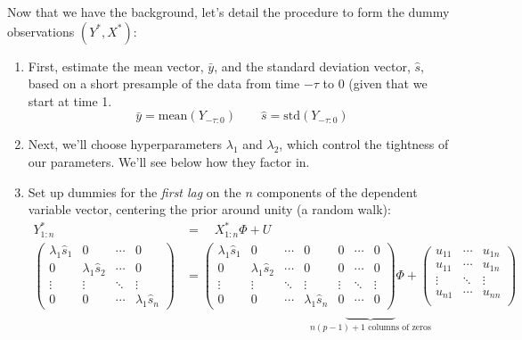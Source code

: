 \documentclass[12pt]{article}
\theoremstyle{plain}
\theoremstyle{definition}
\theoremstyle{remark}
\begin{document}
Now that we have the background, let's detail the procedure
to form the dummy observations $( Y^*, X^*)$:
\begin{enumerate}
    \item First, estimate the mean vector, $\bar{y}$, and the
	standard deviation vector, $\hat{s}$, based on
	a short presample of the data from time
	$-\tau$ to 0 (given that we start at time 1.
	\[ \bar{y} = \text{mean}\left(Y_{-\tau:0}\right)
	    \qquad \hat{s} = \text{std}\left(Y_{-\tau:0}\right)
	    \]
    \item Next, we'll choose hyperparameters $\lambda_1$ and
	$\lambda_2$, which control the tightness of our
	parameters. We'll see below how they factor in.
    \item Set up dummies for the \emph{first lag} on the $n$
	components of the dependent variable vector,
	centering the prior around unity (a random walk):
	\begin{align*}
	    Y^*_{1:n} \quad &= \quad X^*_{1:n} \Phi + U \\
	    \begin{pmatrix} \lambda_1 \hat{s}_1
		    & 0 & \cdots & 0 \\ 
		0 & \lambda_1 \hat{s}_2 & \cdots & 0 \\ 
		\vdots & \vdots & \ddots & \vdots \\
		0 & 0 & \cdots &
		\lambda_1 \hat{s}_n \end{pmatrix} &=
	    \begin{pmatrix} \lambda_1 \hat{s}_1 & 0 & \cdots &
		0 & 0 & \cdots & 0 \\
		0 & \lambda_1 \hat{s}_2 & \cdots & 0 & 0 &
		\cdots & 0 \\
		\vdots & \vdots & \ddots & \vdots & \vdots &
		\ddots & \vdots \\
		0 & 0 & \cdots & \lambda_1 \hat{s}_n &
		0 & \cdots &  0
	    \end{pmatrix} \Phi +
	    \begin{pmatrix}
		u_{11} & \cdots & u_{1n} \\
		u_{11} & \cdots & u_{1n} \\
		\vdots  & \ddots & \vdots \\
		u_{n1} & \cdots & u_{nn} \\
	    \end{pmatrix}  \\
	    & \qquad \qquad \qquad \qquad \qquad
	    \underbrace{\qquad\qquad}_{
		\text{$n(p-1) +1$ columns of zeros}}
	\end{align*}


\end{enumerate}
\end{document}
